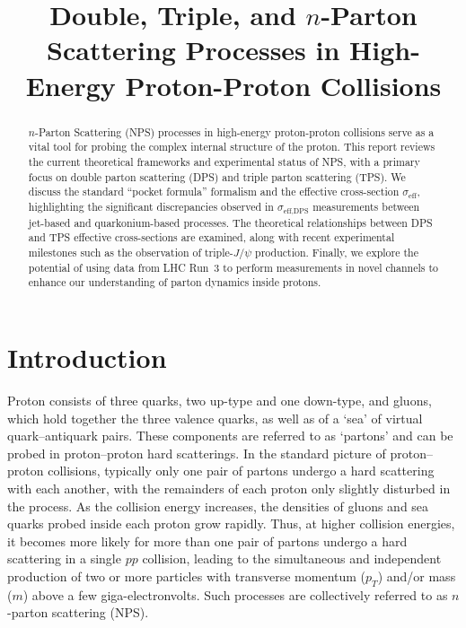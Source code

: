 
\begin{survey}
\label{cha:survey}

\title{Double, Triple, and $n$-Parton Scattering Processes in High-Energy Proton-Proton Collisions}
\maketitle

\tableofcontents

\begin{abstract}
$n$-Parton Scattering (NPS) processes in high-energy proton-proton collisions serve as a vital tool for probing the complex internal structure of the proton. This report reviews the current theoretical frameworks and experimental status of NPS, with a primary focus on double parton scattering (DPS) and triple parton scattering (TPS). We discuss the standard ``pocket formula'' formalism and the effective cross-section $\sigma_{\text{eff}}$, highlighting the significant discrepancies observed in $\sigma_{\text{eff,DPS}}$ measurements between jet-based and quarkonium-based processes. The theoretical relationships between DPS and TPS effective cross-sections are examined, along with recent experimental milestones such as the observation of triple-$J/\psi$ production. Finally, we explore the potential of using data from LHC Run~3 to perform measurements in novel channels to enhance our understanding of parton dynamics inside protons.
\end{abstract}

\section{Introduction}

Proton consists of three quarks, two up-type and one down-type, and gluons, which hold together the three valence quarks, as well as of a `sea' of virtual quark--antiquark pairs.
These components are referred to as `partons' and can be probed in proton--proton hard scatterings.
In the standard picture of proton--proton collisions, typically only one pair of partons undergo a hard scattering with each another, with the remainders of each proton only slightly disturbed in the process.
As the collision energy increases, the densities of gluons and sea quarks probed inside each proton grow rapidly. Thus, at higher collision energies, it becomes more likely for more than one pair of partons undergo a hard scattering in a single $pp$ collision, leading to the simultaneous and independent production of two or more particles with transverse momentum ($p_T$) and/or mass ($m$) above a few giga-electronvolts.
Such processes are collectively referred to as $n$-parton scattering (NPS).


\end{survey}
